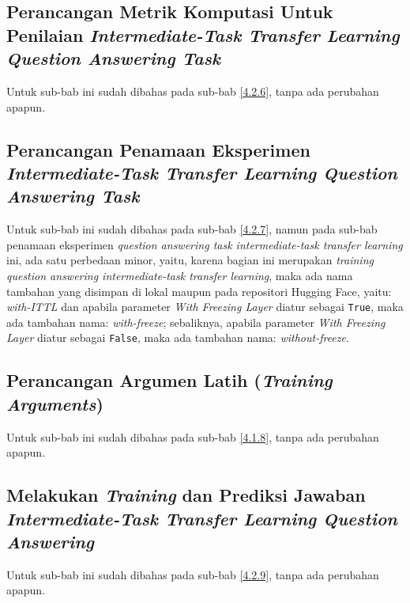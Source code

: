 \subsection{Perancangan Metrik Komputasi Untuk Penilaian \emph{Intermediate-Task Transfer Learning Question Answering Task}}
\label{4.3.8}
Untuk sub-bab ini sudah dibahas pada sub-bab \ref{4.2.6}, tanpa ada perubahan apapun.

\subsection{Perancangan Penamaan Eksperimen \emph{Intermediate-Task Transfer Learning Question Answering Task}}
\label{4.3.9}
Untuk sub-bab ini sudah dibahas pada sub-bab \ref{4.2.7}, namun pada sub-bab penamaan eksperimen \emph{question answering task intermediate-task transfer learning} ini, ada satu perbedaan minor, yaitu, karena bagian ini merupakan \emph{training question answering intermediate-task transfer learning}, maka ada nama tambahan yang disimpan di lokal maupun pada repositori Hugging Face, yaitu: \emph{with-ITTL} dan apabila parameter \emph{With Freezing Layer} diatur sebagai \texttt{True}, maka ada tambahan nama: \emph{with-freeze}; sebaliknya, apabila parameter \emph{With Freezing Layer} diatur sebagai \texttt{False}, maka ada tambahan nama: \emph{without-freeze}.

\subsection{Perancangan Argumen Latih (\emph{Training Arguments})}
\label{4.3.10}
Untuk sub-bab ini sudah dibahas pada sub-bab \ref{4.1.8}, tanpa ada perubahan apapun.

\subsection{Melakukan \emph{Training} dan Prediksi Jawaban \emph{Intermediate-Task Transfer Learning Question Answering}}
\label{4.3.11}
Untuk sub-bab ini sudah dibahas pada sub-bab \ref{4.2.9}, tanpa ada perubahan apapun.

